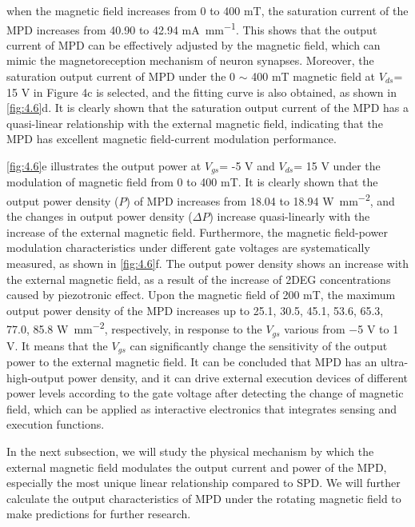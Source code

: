 \noindent when the magnetic field increases from 0 to 400 \unit{\milli\tesla}, the saturation current of the MPD increases from 40.90 to 42.94 \unit{\mA\per\mm}. This shows that the output current of MPD can be effectively adjusted by the magnetic field, which can mimic the  magnetoreception mechanism of neuron synapses. Moreover, the saturation output current of MPD under the 0 $\sim$ 400 \unit{\milli\tesla} magnetic field at $V_{ds}$= 15 \unit{\V} in Figure 4c is selected, and the fitting curve is also obtained, as shown in \autoref{fig:4.6}d. It is clearly shown that the saturation output current of the MPD has a quasi-linear relationship with the external magnetic field, indicating that the MPD has excellent magnetic  field-current modulation performance. 

\autoref{fig:4.6}e illustrates  the output power  at $V_{gs}$= -5 \unit{\V} and $V_{ds}$= 15 \unit{\V} under the modulation of magnetic field from 0 to 400 \unit{\milli\tesla}. It is clearly shown that the output power density ($P$) of MPD increases from 18.04 to 18.94 \unit{\W\per\square\mm}, and the changes in output power density ($\Delta P$) increase quasi-linearly with the increase of the external magnetic field. Furthermore, the magnetic field-power modulation characteristics under different gate voltages  are systematically measured, as shown in \autoref{fig:4.6}f. The output power density shows an increase with the external magnetic field, as a result of the increase of 2DEG  concentrations caused by piezotronic  effect. Upon the magnetic field of 200 \unit{\milli\tesla}, the maximum output power density of the MPD increases up to 25.1, 30.5, 45.1, 53.6, 65.3, 77.0, 85.8 \unit{\W\per\square\mm}, respectively, in response to the $V_{gs}$ various from −5 \unit{\V} to 1 \unit{\V}. It means that the $V_{gs}$ can significantly change the sensitivity of the output power to the external magnetic field. It can be concluded that MPD has an ultra-high-output power density, and it can drive external execution devices of different power levels according to the gate voltage  after detecting the change of magnetic field, which can be applied as interactive electronics that integrates sensing and execution functions. 

In the  next subsection, we will study the physical mechanism  by which the external magnetic field modulates the output current and power of the MPD, especially the most unique linear relationship compared to  SPD. We will further calculate the output characteristics of MPD under the rotating magnetic field to make predictions for further research.


